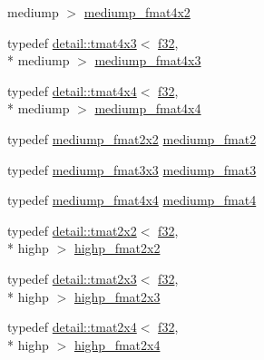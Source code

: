 \begin{DoxyCompactItemize}
mediump $>$ \hyperlink{group__gtc__type__precision_ga09a2851d38fe3cf52735a1d26199bdcc}{mediump\-\_\-fmat4x2}
\item 
typedef \hyperlink{structglm_1_1detail_1_1tmat4x3}{detail\-::tmat4x3}$<$ \hyperlink{group__gtc__type__precision_ga0ec999b57f5330d9021256e96038df04}{f32}, \\*
mediump $>$ \hyperlink{group__gtc__type__precision_ga5e5de428d1e1da2c593a6245d92dd8c0}{mediump\-\_\-fmat4x3}
\item 
typedef \hyperlink{structglm_1_1detail_1_1tmat4x4}{detail\-::tmat4x4}$<$ \hyperlink{group__gtc__type__precision_ga0ec999b57f5330d9021256e96038df04}{f32}, \\*
mediump $>$ \hyperlink{group__gtc__type__precision_ga7f4ae9d05ca94005a0b7d8e3c59943cd}{mediump\-\_\-fmat4x4}
\item 
typedef \hyperlink{group__gtc__type__precision_gae9af1d96efbaeeb5c5edd9c7b0a24fa5}{mediump\-\_\-fmat2x2} \hyperlink{group__gtc__type__precision_ga5b9de77ef7403ffc972700219eca5450}{mediump\-\_\-fmat2}
\item 
typedef \hyperlink{group__gtc__type__precision_gaa7f015dd5b962a658178bb881d4620cc}{mediump\-\_\-fmat3x3} \hyperlink{group__gtc__type__precision_ga85f2267401434ea8c5463af040f0760c}{mediump\-\_\-fmat3}
\item 
typedef \hyperlink{group__gtc__type__precision_ga7f4ae9d05ca94005a0b7d8e3c59943cd}{mediump\-\_\-fmat4x4} \hyperlink{group__gtc__type__precision_ga6cd3ae1f3509b79061edcc83564769d4}{mediump\-\_\-fmat4}
\item 
typedef \hyperlink{structglm_1_1detail_1_1tmat2x2}{detail\-::tmat2x2}$<$ \hyperlink{group__gtc__type__precision_ga0ec999b57f5330d9021256e96038df04}{f32}, \\*
highp $>$ \hyperlink{group__gtc__type__precision_gaeb76f1230ecfd4c80635d3c618405e31}{highp\-\_\-fmat2x2}
\item 
typedef \hyperlink{structglm_1_1detail_1_1tmat2x3}{detail\-::tmat2x3}$<$ \hyperlink{group__gtc__type__precision_ga0ec999b57f5330d9021256e96038df04}{f32}, \\*
highp $>$ \hyperlink{group__gtc__type__precision_ga53c126d1650b460bc7496a6fd5e5e764}{highp\-\_\-fmat2x3}
\item 
typedef \hyperlink{structglm_1_1detail_1_1tmat2x4}{detail\-::tmat2x4}$<$ \hyperlink{group__gtc__type__precision_ga0ec999b57f5330d9021256e96038df04}{f32}, \\*
highp $>$ \hyperlink{group__gtc__type__precision_ga5df8430c47272adc901ef224d85a9c4d}{highp\-\_\-fmat2x4}

\end{DoxyCompactItemize}
